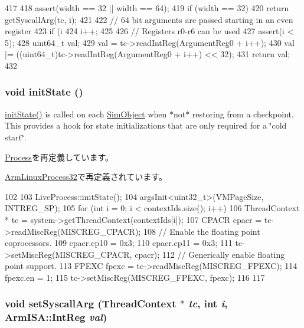 \begin{DoxyCode}
417 {
418     assert(width == 32 || width == 64);
419     if (width == 32)
420         return getSyscallArg(tc, i);
421 
422     // 64 bit arguments are passed starting in an even register
423     if (i %
424        i++;
425 
426     // Registers r0-r6 can be used
427     assert(i < 5);
428     uint64_t val;
429     val = tc->readIntReg(ArgumentReg0 + i++);
430     val |= ((uint64_t)tc->readIntReg(ArgumentReg0 + i++) << 32);
431     return val;
432 }
\end{DoxyCode}
\hypertarget{classArmLiveProcess32_a3c34ea9b29f410748d4435a667484924}{
\subsubsection[{initState}]{\setlength{\rightskip}{0pt plus 5cm}void initState ()}}
\label{classArmLiveProcess32_a3c34ea9b29f410748d4435a667484924}
\hyperlink{classArmLiveProcess32_a3c34ea9b29f410748d4435a667484924}{initState()} is called on each \hyperlink{classSimObject}{SimObject} when $\ast$not$\ast$ restoring from a checkpoint. This provides a hook for state initializations that are only required for a \char`\"{}cold start\char`\"{}. 

\hyperlink{classProcess_a3c34ea9b29f410748d4435a667484924}{Process}を再定義しています。

\hyperlink{classArmLinuxProcess32_a3c34ea9b29f410748d4435a667484924}{ArmLinuxProcess32}で再定義されています。


\begin{DoxyCode}
102 {
103     LiveProcess::initState();
104     argsInit<uint32_t>(VMPageSize, INTREG_SP);
105     for (int i = 0; i < contextIds.size(); i++) {
106         ThreadContext * tc = system->getThreadContext(contextIds[i]);
107         CPACR cpacr = tc->readMiscReg(MISCREG_CPACR);
108         // Enable the floating point coprocessors.
109         cpacr.cp10 = 0x3;
110         cpacr.cp11 = 0x3;
111         tc->setMiscReg(MISCREG_CPACR, cpacr);
112         // Generically enable floating point support.
113         FPEXC fpexc = tc->readMiscReg(MISCREG_FPEXC);
114         fpexc.en = 1;
115         tc->setMiscReg(MISCREG_FPEXC, fpexc);
116     }
117 }
\end{DoxyCode}
\hypertarget{classArmLiveProcess32_addce5483f248b617812cb55b7e58ffd0}{
\subsubsection[{setSyscallArg}]{\setlength{\rightskip}{0pt plus 5cm}void setSyscallArg ({\bf ThreadContext} $\ast$ {\em tc}, \/  int {\em i}, \/  {\bf ArmISA::IntReg} {\em val})}}
\label{classArmLiveProcess32_addce5483f248b617812cb55b7e58ffd0}



